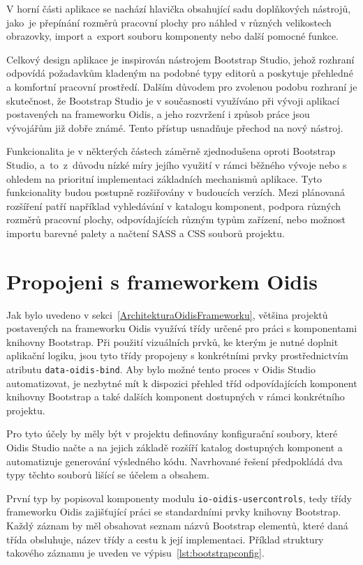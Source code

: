 V horní části aplikace se nachází hlavička obsahující sadu doplňkových nástrojů, jako~je přepínání rozměrů pracovní plochy pro náhled v různých velikostech obrazovky, import a~export souboru komponenty nebo další pomocné funkce.

Celkový design aplikace je inspirován nástrojem Bootstrap Studio, jehož rozhraní odpovídá požadavkům kladeným na podobné typy editorů a poskytuje přehledné a komfortní pracovní prostředí. Dalším důvodem pro zvolenou podobu rozhraní je skutečnost, že Bootstrap Studio je v současnosti využíváno při vývoji aplikací postavených na frameworku Oidis, a jeho rozvržení i způsob práce jsou vývojářům již dobře známé. Tento přístup usnadňuje přechod na nový nástroj.

Funkcionalita je v některých částech záměrně zjednodušena oproti Bootstrap Studio, a~to~z~důvodu nízké míry jejího využití v rámci běžného vývoje nebo s ohledem na prioritní implementaci základních mechanismů aplikace. Tyto funkcionality budou postupně rozšiřovány v budoucích verzích. Mezi plánovaná rozšíření patří například vyhledávání v katalogu komponent, podpora různých rozměrů pracovní plochy, odpovídajících různým typům zařízení, nebo možnost importu barevné palety a načtení SASS a CSS souborů projektu.

\section{Propojeni s frameworkem Oidis}
\label{metadata}
Jak bylo uvedeno v sekci~\ref{ArchitekturaOidisFrameworku}, většina projektů postavených na frameworku Oidis využívá třídy určené pro práci s komponentami knihovny Bootstrap. Při použití vizuálních prvků, ke kterým je nutné doplnit aplikační logiku, jsou tyto třídy propojeny s konkrétními prvky prostřednictvím atributu \texttt{data-oidis-bind}. Aby bylo možné tento proces v Oidis Studio automatizovat, je nezbytné mít k dispozici přehled tříd odpovídajících komponent knihovny Bootstrap a také dalších komponent dostupných v rámci konkrétního projektu.

Pro tyto účely by měly být v projektu definovány konfigurační soubory, které Oidis Studio načte a na jejich základě rozšíří katalog dostupných komponent a automatizuje generování výsledného kódu. Navrhované řešení předpokládá dva typy těchto souborů lišící se účelem a obsahem.

První typ by popisoval komponenty modulu \texttt{io-oidis-usercontrols}, tedy třídy frameworku Oidis zajišťující práci se standardními prvky knihovny Bootstrap. Každý záznam by měl obsahovat seznam názvů Bootstrap elementů, které daná třída obsluhuje, název třídy a cestu k její implementaci. Příklad struktury takového záznamu je uveden ve výpisu~\ref{lst:bootstrapconfig}.

